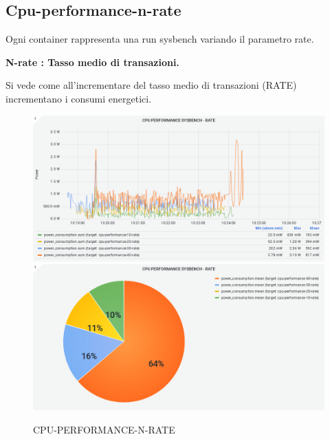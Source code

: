 \documentclass[a4paper, 11pt]{article}
\begin{document}
\subsection{Cpu-performance-n-rate}
\begin{flushleft}
Ogni container rappresenta una run sysbench variando il parametro rate.
\begin{center}
\textbf{N-rate : Tasso medio di transazioni.}
\end{center}
Si vede come all'incrementare del tasso medio di transazioni (RATE) incrementano i consumi energetici.
\end{flushleft}
\begin{figure}[h]
\caption{CPU-PERFORMANCE-N-RATE}
\centering
\includegraphics[scale=0.4]{image19}
\includegraphics[scale=0.4]{image37}
\end{figure}
\clearpage
\end{document}
